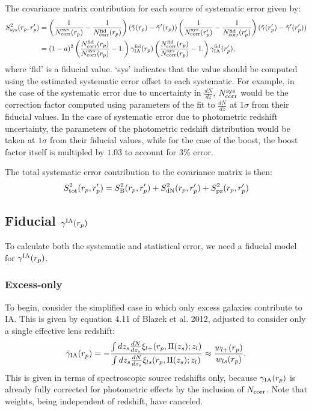 \documentclass[onecolumn,amsmath,aps,fleqn, superscriptaddress]{revtex4}
\begin{document}
The covariance matrix contribution for each source of systematic error given by:
\begin{align}
S_{\rm sys}^2(r_p, r_p^\prime) &= \left(\frac{1}{N_{\rm corr}^{\rm sys}(r_p)} - \frac{1}{N_{\rm corr}^{\rm fid}(r_p)}\right)(\tilde{\gamma}(r_p) - \tilde{\gamma}^\prime(r_p))  \left(\frac{1}{N_{\rm corr}^{\rm sys}(r_p^\prime)} - \frac{1}{N_{\rm corr}^{\rm fid}(r_p^\prime)}\right)(\tilde{\gamma}(r_p^\prime) - \tilde{\gamma}^\prime(r_p^\prime)) \nonumber \\
& = (1-a)^2 \left(\frac{N_{\rm corr}^{\rm fid}(r_p)}{N_{\rm corr}^{\rm sys}(r_p)}-1.\right) \gamma_{\rm IA}^{\rm fid}(r_p) \left(\frac{N_{\rm corr}^{\rm fid}(r_p)}{N_{\rm corr}^{\rm sys}(r_p)}-1.\right)\gamma_{\rm IA}^{\rm fid}(r_p'),
\label{sys_general}
\end{align}
where `fid' is a fiducial value. `sys' indicates that the value should be computed using the estimated systematic error offset to each systematic. For example, in the case of the systematic error due to uncertainty in $\frac{dN}{dz}$, $N^{\rm sys}_{\rm corr}$ would be the correction factor computed using parameters of the fit to $\frac{dN}{dz}$ at $1\sigma$ from their fiducial values. In the case of systematic error due to photometric redshift uncertainty, the parameters of the photometric redshift distribution would be taken at $1\sigma$ from their fiducial values, while for the case of the boost, the boost factor itself is multipled by $1.03$ to account for 3\% error. 

The total systematic error contribution to the covariance matrix is then:
\begin{equation}
S_{\rm tot}^2(r_p, r_p^\prime) = S_{\rm B}^2(r_p, r_p^\prime) + S_{\rm dN}^2(r_p, r_p^\prime) + S_{\rm pz}^2(r_p, r_p^\prime)
\label{sysall}
\end{equation}

\subsection{Fiducial $\gamma^{\rm IA}(r_p)$}
To calculate both the systematic and statistical error, we need a fiducial model for $\gamma^{\rm IA}(r_p)$.

\subsubsection*{Excess-only}
To begin, consider the simplified case in which only excess galaxies contribute to IA. This is given by equation 4.11 of Blazek et al. 2012, adjusted to consider only a single effective lens redshift:
\begin{equation}
\bar{\gamma}_{\rm IA}(r_p) = -\frac{\int dz_s \frac{dN}{dz_s} \xi_{l+}(r_p, \Pi(z_s); z_l)}{\int dz_s \frac{dN}{dz_s} \xi_{ls}(r_p, \Pi(z_s); z_l)} \approx \frac{w_{l+}(r_p)}{w_{ls}(r_p)}.
\label{gamma_blazek}
\end{equation}
This is given in terms of spectroscopic source redshifts only, because $\gamma_{\rm IA}(r_p)$ is already fully corrected for photometric effects by the inclusion of $N_{\rm corr}$. Note that weights, being independent of redshift, have canceled. 
\end{document}
